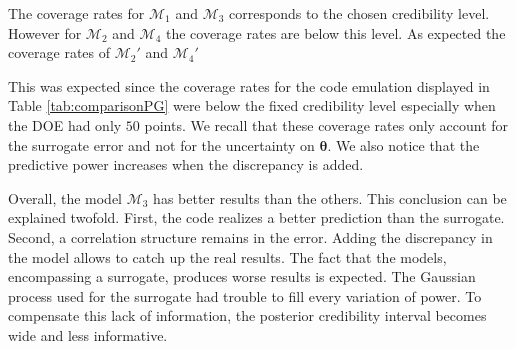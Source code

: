 \documentclass[soumission]{jsfds}
\begin{document}
The coverage rates for $\mathcal{M}_1$ and $\mathcal{M}_3$ corresponds to the chosen credibility level.
However for $\mathcal{M}_2$ and $\mathcal{M}_4$ 
the coverage rates are below this level. As expected the coverage rates of $\mathcal{M}_2'$ and $\mathcal{M}_4'$



This was expected since the coverage rates for the code emulation displayed in Table \ref{tab:comparisonPG} were below the fixed credibility level
especially when the DOE had only $50$ points. We recall that these coverage rates only account for the surrogate error and not for the uncertainty
on $\boldsymbol{\theta}$.
We also notice that the predictive power increases when the discrepancy is added. \newline



Overall, the model $\mathcal{M}_3$ has better results than the others. 
This conclusion can be explained twofold. First, the code realizes a better prediction than the surrogate.
Second, a correlation structure remains in the error. Adding the discrepancy in the model allows to catch up the real results.
The fact that the models, encompassing a surrogate, produces worse results is expected. The Gaussian process used for the surrogate had trouble to fill every variation of power. To compensate this lack of information, the posterior credibility interval becomes wide and less informative.\newline
\end{document}
